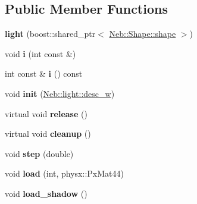 \subsection*{\-Public \-Member \-Functions}
\begin{DoxyCompactItemize}
\item 
\hypertarget{classNeb_1_1light_1_1light_a386fd6a5ef77a7eed3b256abf9592bd3}{{\bfseries light} (boost\-::shared\-\_\-ptr$<$ \hyperlink{classNeb_1_1Shape_1_1shape}{\-Neb\-::\-Shape\-::shape} $>$)}\label{classNeb_1_1light_1_1light_a386fd6a5ef77a7eed3b256abf9592bd3}

\item 
\hypertarget{classNeb_1_1light_1_1light_a2e182292a20a69706c5b4a232405298f}{void {\bfseries i} (int const \&)}\label{classNeb_1_1light_1_1light_a2e182292a20a69706c5b4a232405298f}

\item 
\hypertarget{classNeb_1_1light_1_1light_a701a5c8eaf02f1b2cf541b7fc151fd4c}{int const \& {\bfseries i} () const }\label{classNeb_1_1light_1_1light_a701a5c8eaf02f1b2cf541b7fc151fd4c}

\item 
\hypertarget{classNeb_1_1light_1_1light_a0fe4b74646348d1eea82cb1d459d777b}{void {\bfseries init} (\hyperlink{classNeb_1_1weak__ptr}{\-Neb\-::light\-::desc\-\_\-w})}\label{classNeb_1_1light_1_1light_a0fe4b74646348d1eea82cb1d459d777b}

\item 
\hypertarget{classNeb_1_1light_1_1light_a84dc2f6887e3423c6083c5c7117e5705}{virtual void {\bfseries release} ()}\label{classNeb_1_1light_1_1light_a84dc2f6887e3423c6083c5c7117e5705}

\item 
\hypertarget{classNeb_1_1light_1_1light_a2b84a85ec45ca3c1ce026b66fb0ae310}{virtual void {\bfseries cleanup} ()}\label{classNeb_1_1light_1_1light_a2b84a85ec45ca3c1ce026b66fb0ae310}

\item 
\hypertarget{classNeb_1_1light_1_1light_acdc6017964716e7f118d1f3e6f242848}{void {\bfseries step} (double)}\label{classNeb_1_1light_1_1light_acdc6017964716e7f118d1f3e6f242848}

\item 
\hypertarget{classNeb_1_1light_1_1light_af8e4d31c7bd65dd7f51f4813d946eb94}{void {\bfseries load} (int, physx\-::\-Px\-Mat44)}\label{classNeb_1_1light_1_1light_af8e4d31c7bd65dd7f51f4813d946eb94}

\item 
\hypertarget{classNeb_1_1light_1_1light_aa37d836e3b1ea0fbd44023482069e0b5}{void {\bfseries load\-\_\-shadow} ()}\label{classNeb_1_1light_1_1light_aa37d836e3b1ea0fbd44023482069e0b5}


\end{DoxyCompactItemize}
